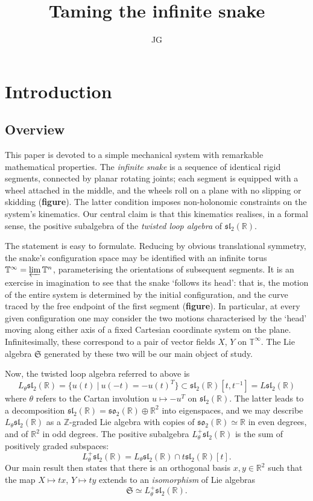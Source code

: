\documentclass{article}
\title{Taming the infinite snake}
\author{JG}\affil{Klara Weber Institute}
\def\fsl{\mathfrak{sl}}
\def\fso{\mathfrak{so}}
\def\fS{\mathfrak{S}}
\def\ZZ{\mathbb{Z}}
\def\RR{\mathbb{R}}
\def\TT{\mathbb{T}}
\theoremstyle{definition}
\begin{document}
\sloppy\maketitle
\tableofcontents
\section{Introduction}
\label{sec:intro}
\subsection{Overview}
This paper is devoted to a simple mechanical
system with remarkable mathematical properties.
The \emph{infinite snake} is a sequence of 
identical rigid segments, connected by
planar rotating joints; each segment is
equipped with a wheel attached in the middle,
and the wheels roll 
on a plane with no slipping
or skidding (\textbf{figure}). The latter condition 
imposes non-holonomic constraints on the system's kinematics.
Our central claim is that
this kinematics realises, in a formal sense, the positive
subalgebra of the 
\emph{twisted loop algebra} of $\fsl_2(\RR)$. 

The statement is easy to formulate. Reducing by obvious translational
symmetry, the snake's configuration space may be identified with an
infinite torus $\TT^\infty = \varprojlim \TT^n$, parameterising
the orientations of subsequent segments.
It is an exercise in imagination to see that the snake `follows its head':
that is, the motion of the entire system is determined by the initial configuration,
and the curve traced by the free endpoint of the first segment (\textbf{figure}). 
In particular, at every given configuration one may consider the two motions characterised
by the `head' moving along either axis of a fixed Cartesian coordinate system on the plane.
Infinitesimally, these correspond to a pair of vector fields $X$, $Y$ on $\TT^\infty$.
The Lie algebra $\fS$ generated by these two will be our main object of study.

Now, the twisted loop algebra referred to above is
$$
L_\theta\fsl_2(\RR) = \{ u(t)\ |\ u(-t)=-u(t)^T \} \subset \fsl_2(\RR)[t,t^{-1}] = L\fsl_2(\RR)
$$
where $\theta$ refers to the Cartan involution $u \mapsto -u^T$ on $\fsl_2(\RR)$.
The latter leads to a decomposition $\fsl_2(\RR) = \fso_2(\RR) \oplus \RR^2$ into eigenspaces,
and we may describe $L_\theta\fsl_2(\RR)$ as a $\ZZ$-graded Lie algebra with copies of 
$\fso_2(\RR)\simeq\RR$ in even degrees, and of $\RR^2$ in odd degrees.
The positive subalgebra $L_\theta^+\fsl_2(\RR)$ is the sum of positively graded subspaces:
$$
L_\theta^+\fsl_2(\RR) = L_\theta\fsl_2(\RR) \cap t \fsl_2(\RR)[t].
$$
Our main result then states that there is an orthogonal
basis $x,y\in\RR^2$ such that the map $X\mapsto tx$, $Y\mapsto ty$
extends to an \emph{isomorphism} of Lie algebras
$$\fS \simeq L_\theta^+\fsl_2(\RR). $$
\end{document}

